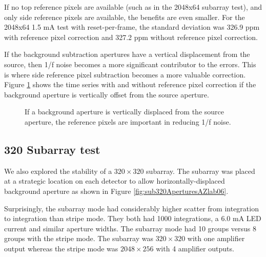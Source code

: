 \documentclass{aastex62}
\begin{document}
If no top reference pixels are available (such as in the 2048x64 subarray test), and only side reference pixels are available, the benefits are even smaller.
For the 2048x64 1.5 mA test with reset-per-frame, the standard deviation was 326.9 ppm with reference pixel correction and 327.2 ppm without reference pixel correction.

If the background subtraction apertures have a vertical displacement from the source, then 1/f noise becomes a more significant contributor to the errors.
This is where side reference pixel subtraction becomes a more valuable correction.
Figure \ref{fig:RefpixWithVertOffsetBackground} shows the time series with and without reference pixel correction if the background aperture is vertically offset from the source aperture.

\begin{figure}
{}
{}
\caption{If a background aperture is vertically displaced from the source aperture, the reference pixels are important in reducing 1/f noise.}\label{fig:RefpixWithVertOffsetBackground}
\end{figure}

\clearpage
\subsection{320 Subarray test}
We also explored the stability of a $320 \times 320$ subarray.
The subarray was placed at a strategic location on each detector to allow horizontally-displaced background aperture as shown in Figure \ref{fig:sub320AperturesAZlab06}.

Surprisingly, the subarray mode had considerably higher scatter from integration to integration than stripe mode.
They both had 1000 integrations, a 6.0 mA LED current and similar aperture widths.
The subarray mode had 10 groups versus 8 groups with the stripe mode.
The subarray was $320 \times 320$ with one amplifier output whereas the stripe mode was $2048 \times 256$ with 4 amplifier outputs.
\end{document}
